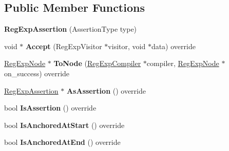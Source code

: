 \subsection*{Public Member Functions}
\begin{DoxyCompactItemize}
\item 
{\bfseries Reg\+Exp\+Assertion} (Assertion\+Type type)\hypertarget{classv8_1_1internal_1_1_reg_exp_assertion_ae325317a5f448cd0348f9ef0aa6484dd}{}\label{classv8_1_1internal_1_1_reg_exp_assertion_ae325317a5f448cd0348f9ef0aa6484dd}

\item 
void $\ast$ {\bfseries Accept} (Reg\+Exp\+Visitor $\ast$visitor, void $\ast$data) override\hypertarget{classv8_1_1internal_1_1_reg_exp_assertion_a0606f394e1699af2dbbb8d72a466d066}{}\label{classv8_1_1internal_1_1_reg_exp_assertion_a0606f394e1699af2dbbb8d72a466d066}

\item 
\hyperlink{classv8_1_1internal_1_1_reg_exp_node}{Reg\+Exp\+Node} $\ast$ {\bfseries To\+Node} (\hyperlink{classv8_1_1internal_1_1_reg_exp_compiler}{Reg\+Exp\+Compiler} $\ast$compiler, \hyperlink{classv8_1_1internal_1_1_reg_exp_node}{Reg\+Exp\+Node} $\ast$on\+\_\+success) override\hypertarget{classv8_1_1internal_1_1_reg_exp_assertion_a6fbe8b61b97d9cc28bbc5d015b55e8ba}{}\label{classv8_1_1internal_1_1_reg_exp_assertion_a6fbe8b61b97d9cc28bbc5d015b55e8ba}

\item 
\hyperlink{classv8_1_1internal_1_1_reg_exp_assertion}{Reg\+Exp\+Assertion} $\ast$ {\bfseries As\+Assertion} () override\hypertarget{classv8_1_1internal_1_1_reg_exp_assertion_a6ecb119f925edc2e456428efb6542e7d}{}\label{classv8_1_1internal_1_1_reg_exp_assertion_a6ecb119f925edc2e456428efb6542e7d}

\item 
bool {\bfseries Is\+Assertion} () override\hypertarget{classv8_1_1internal_1_1_reg_exp_assertion_aab40f853b6b7862af64c12b6b10f9ef5}{}\label{classv8_1_1internal_1_1_reg_exp_assertion_aab40f853b6b7862af64c12b6b10f9ef5}

\item 
bool {\bfseries Is\+Anchored\+At\+Start} () override\hypertarget{classv8_1_1internal_1_1_reg_exp_assertion_a90ad621f84e8eabd1ecb43999897f5df}{}\label{classv8_1_1internal_1_1_reg_exp_assertion_a90ad621f84e8eabd1ecb43999897f5df}

\item 
bool {\bfseries Is\+Anchored\+At\+End} () override\hypertarget{classv8_1_1internal_1_1_reg_exp_assertion_a4f6c10ba865665f43d18bf7177a1fec2}{}\label{classv8_1_1internal_1_1_reg_exp_assertion_a4f6c10ba865665f43d18bf7177a1fec2}


\end{DoxyCompactItemize}
